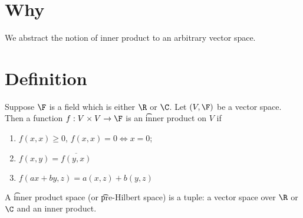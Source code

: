 
\section*{Why}

We abstract the notion of inner product to an arbitrary vector space.

\section*{Definition}

Suppose $\F $ is a field which is either $\R $ or $\C $. Let $(V, \F )$ be a vector space.
Then a function $f: V \times  V \to \F $ is an \t{inner product} on $V$ if
    \begin{enumerate}
      \item $f(x, x) \geq 0$, $f(x, x) = 0 \Leftrightarrow x = 0$;
      \item $f(x, y) = \overline{f(y, x)}$
      \item $f(ax + by, z) = a(x, z) + b(y, z)$
    \end{enumerate}
A \t{inner product space} (or \t{pre-Hilbert space}) is a tuple: a vector space over $\R $ or $\C $ and an inner product.

\blankpage